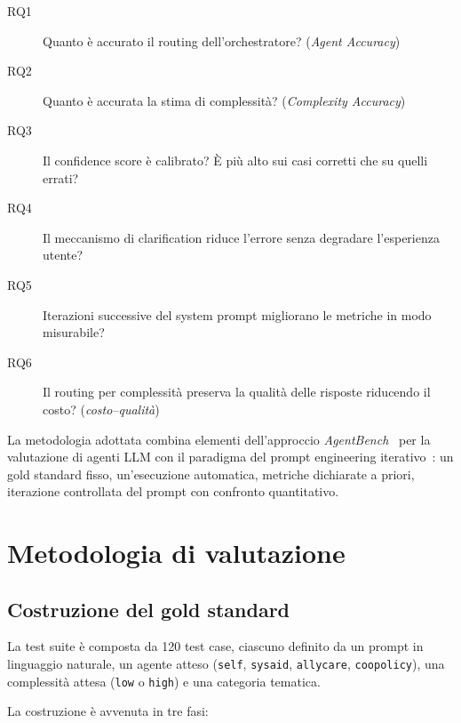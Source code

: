 \begin{description}
  \item[RQ1] Quanto è accurato il routing dell'orchestratore? (\emph{Agent Accuracy})
  \item[RQ2] Quanto è accurata la stima di complessità? (\emph{Complexity Accuracy})
  \item[RQ3] Il confidence score è calibrato? È più alto sui casi corretti che su quelli errati?
  \item[RQ4] Il meccanismo di clarification riduce l'errore senza degradare l'esperienza utente?
  \item[RQ5] Iterazioni successive del system prompt migliorano le metriche in modo misurabile?
  \item[RQ6] Il routing per complessità preserva la qualità delle risposte riducendo il costo? (\emph{costo--qualità})
\end{description}

La metodologia adottata combina elementi dell'approccio \emph{AgentBench}~\cite{liu2023agentbench}
per la valutazione di agenti LLM con il paradigma del prompt engineering iterativo~\cite{sahoo2024prompteng_survey}:
un gold standard fisso, un'esecuzione automatica, metriche dichiarate a priori, iterazione controllata del prompt con confronto quantitativo.

\section{Metodologia di valutazione}
\label{sec:eval-metodologia}

\subsection{Costruzione del gold standard}
\label{subsec:eval-gold-standard}

La test suite è composta da 120 test case, ciascuno definito da un prompt in linguaggio naturale, 
un agente atteso (\texttt{self}, \texttt{sysaid}, \texttt{allycare}, \texttt{coopolicy}), una complessità attesa (\texttt{low} o \texttt{high}) e una categoria tematica.

La costruzione è avvenuta in tre fasi:

